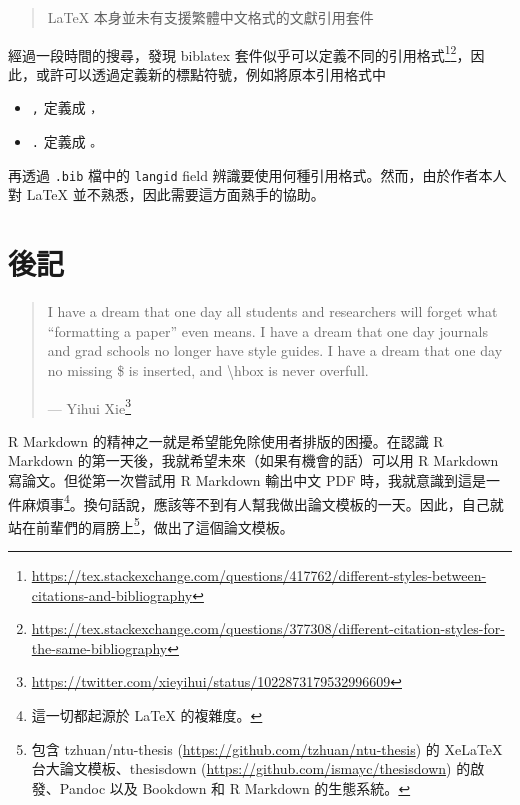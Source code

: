 \documentclass[oneside]{book}
\renewcommand{\href}[2]{#2\footnote{\url{#1}}}
\providecommand{\tightlist}{%
  \setlength{\itemsep}{0pt}\setlength{\parskip}{0pt}}
\begin{document}
\begin{quote}
LaTeX 本身並未有支援繁體中文格式的文獻引用套件
\end{quote}

經過一段時間的搜尋，發現 biblatex 套件似乎可以定義不同的引用格式\footnote{\url{https://tex.stackexchange.com/questions/417762/different-styles-between-citations-and-bibliography}}\footnote{\url{https://tex.stackexchange.com/questions/377308/different-citation-styles-for-the-same-bibliography}}，因此，或許可以透過定義新的標點符號，例如將原本引用格式中

\begin{itemize}
\tightlist
\item
  \texttt{,} 定義成 \texttt{，}
\item
  \texttt{.} 定義成 \texttt{。}
\end{itemize}

再透過 \texttt{.bib} 檔中的 \texttt{langid} field 辨識要使用何種引用格式。然而，由於作者本人對 LaTeX 並不熟悉，因此需要這方面熟手的協助。

\hypertarget{epilogue}{%
\chapter{後記}\label{epilogue}}

\begin{quote}
I have a dream that one day all students and researchers will forget what ``formatting a paper'' even means. I have a dream that one day journals and grad schools no longer have style guides. I have a dream that one day no missing \$ is inserted, and \textbackslash{}hbox is never overfull.

\hspace*{\fill}

--- \href{https://twitter.com/xieyihui/status/1022873179532996609}{Yihui Xie}
\end{quote}

R Markdown 的精神之一就是希望能免除使用者排版的困擾。在認識 R Markdown 的第一天後，我就希望未來（如果有機會的話）可以用 R Markdown 寫論文。但從第一次嘗試用 R Markdown 輸出中文 PDF 時，我就意識到這是一件麻煩事\footnote{這一切都起源於 LaTeX 的複雜度。}。換句話說，應該等不到有人幫我做出論文模板的一天。因此，自己就站在前輩們的肩膀上\footnote{包含 tzhuan/ntu-thesis (\url{https://github.com/tzhuan/ntu-thesis}) 的 XeLaTeX 台大論文模板、thesisdown (\url{https://github.com/ismayc/thesisdown}) 的啟發、Pandoc 以及 Bookdown 和 R Markdown 的生態系統。}，做出了這個論文模板。
\end{document}
